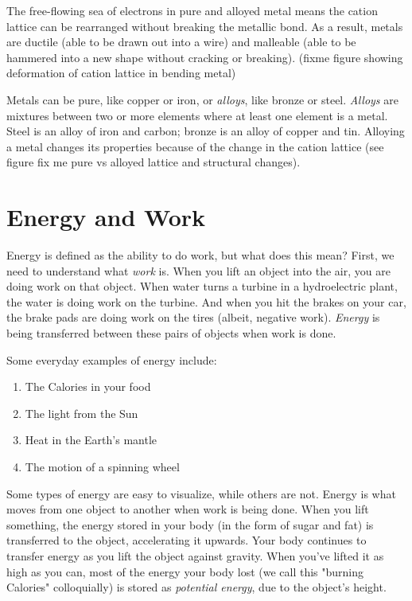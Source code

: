 The free-flowing sea of electrons in pure and alloyed metal means the cation 
lattice can be rearranged without breaking the metallic bond. As a result, metals 
are ductile (able to be drawn out into a wire) and malleable (able to be hammered 
into a new shape without cracking or breaking). (fixme figure showing deformation of cation lattice in bending metal)

Metals can be pure, like copper or iron, or \textit{alloys}, like bronze or steel. 
\textit{Alloys} are mixtures between two or more elements where at least one 
element is a metal. Steel is an alloy of iron and carbon; bronze is 
an alloy of copper and tin. Alloying a metal changes its properties because of 
the change in the cation lattice (see figure fix me pure vs alloyed lattice and 
structural changes). 

\section{Energy and Work}

Energy is defined as the ability to do work, but what does this mean? First, we 
need to understand what \textit{work} is. When you lift an object into the air, 
you are doing work on that object. When water turns a turbine in a hydroelectric 
plant, the water is doing work on the turbine. And when you hit the brakes on your
car, the brake pads are doing work on the tires (albeit, negative work). 
\textit{Energy} is being transferred between these pairs of objects when work is 
done. 

Some everyday examples of energy include:
\begin{enumerate}
\item The Calories in your food
\item The light from the Sun
\item Heat in the Earth's mantle
\item The motion of a spinning wheel
\end{enumerate}

Some types of energy are easy to visualize, while others are not. Energy is what 
moves from one object to another when work is being done. When you lift 
something, the energy stored in your body (in the form of sugar and fat) is 
transferred to the object, accelerating it upwards. Your body continues to 
transfer energy as you lift the object against gravity. When you've lifted it as 
high as you can, most of the energy your body lost (we call this "burning 
Calories" colloquially) is stored as \textit{potential energy}, due to the 
object's height. 

